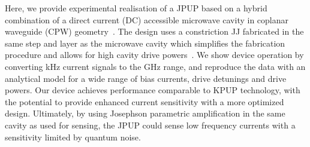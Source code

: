 Here, we provide experimental realisation of a JPUP based on a hybrid combination of a direct current (DC) accessible microwave cavity in coplanar waveguide (CPW) geometry~\cite{bosmanBroadbandArchitectureGalvanically2015a,schmidtBallisticGrapheneSuperconducting2018}.
% 
The design uses a constriction JJ fabricated in the same step and layer as the microwave cavity which simplifies the fabrication procedure and allows for high cavity drive powers~\cite{vijayOptimizingAnharmonicityNanoscale2009a,kennedyTunableNbSuperconducting2019a,rodriguesCouplingMicrowavePhotons2019a,bothnerPhotonPressureStrongCouplingTwo2019}.
% 
We show device operation by converting \si{\kilo\hertz} current signals to the \si{\giga\hertz} range, and reproduce the data with an analytical model for a wide range of bias currents, drive detunings and drive powers.
%
Our device achieves performance comparable to KPUP technology, with the potential to provide enhanced current sensitivity with a more optimized design. Ultimately, by using Josephson parametric amplification in the same cavity as used for sensing, the JPUP could sense low frequency currents with a sensitivity limited by quantum noise.


